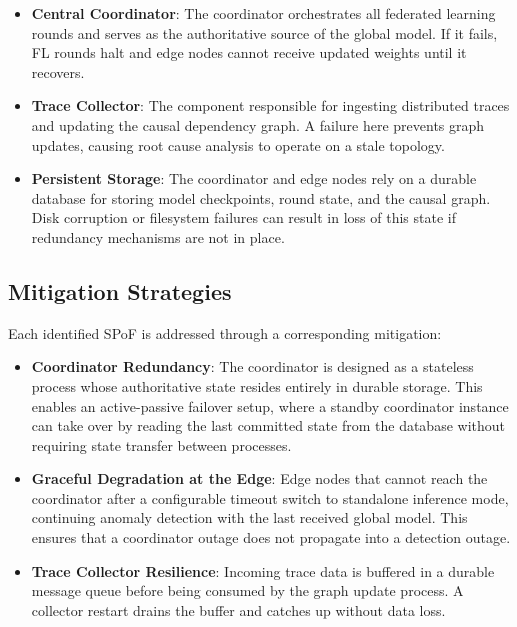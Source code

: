 \begin{itemize}
    \item \textbf{Central Coordinator}: The coordinator orchestrates all federated
    learning rounds and serves as the authoritative source of the global model. If it
    fails, FL rounds halt and edge nodes cannot receive updated weights until it
    recovers.

    \item \textbf{Trace Collector}: The component responsible for ingesting
    distributed traces and updating the causal dependency graph. A failure here
    prevents graph updates, causing root cause analysis to operate on a stale
    topology.

    \item \textbf{Persistent Storage}: The coordinator and edge nodes rely on a
    durable database for storing model checkpoints, round state, and the causal graph.
    Disk corruption or filesystem failures can result in loss of this state if
    redundancy mechanisms are not in place.
\end{itemize}

\subsection{Mitigation Strategies}
\label{subsec:spof_mitigation}

Each identified SPoF is addressed through a corresponding mitigation:

\begin{itemize}
    \item \textbf{Coordinator Redundancy}: The coordinator is designed as a stateless
    process whose authoritative state resides entirely in durable storage. This
    enables an active-passive failover setup, where a standby coordinator instance can
    take over by reading the last committed state from the database without requiring
    state transfer between processes.

    \item \textbf{Graceful Degradation at the Edge}: Edge nodes that cannot reach the
    coordinator after a configurable timeout switch to standalone inference mode,
    continuing anomaly detection with the last received global model. This ensures
    that a coordinator outage does not propagate into a detection outage.

    \item \textbf{Trace Collector Resilience}: Incoming trace data is buffered in a
    durable message queue before being consumed by the graph update process. A
    collector restart drains the buffer and catches up without data loss.
\end{itemize}


